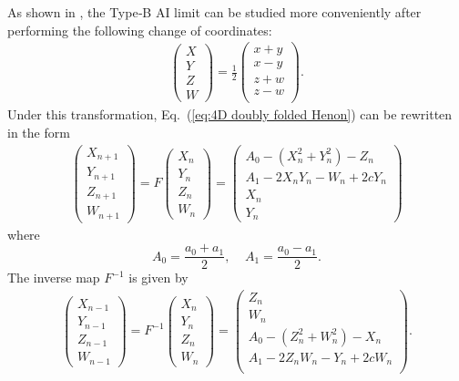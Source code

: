 \documentclass[12pt]{iopart}
\begin{document}
As shown in \cite{Fujioka25}, the Type‑B AI limit can be studied more conveniently after performing the following change of coordinates:
\begin{eqnarray}
	\left(\begin{array}{c}
	X\\
	Y\\
	Z\\
	W
	\end{array}\right)
	=\frac{1}{2}\left(\begin{array}{c}
	x+y\\
	x-y\\
	z+w\\
	z-w\\
	\end{array}\right).
	\label{eq:change_of_coordinate}
\end{eqnarray}
Under this transformation, Eq.~(\ref{eq:4D doubly folded Henon}) can be rewritten in the form
\begin{eqnarray}
\label{eq:map_tranformed}
	\left(\begin{array}{c}
    X_{n+1}\\
    Y_{n+1}\\
    Z_{n+1}\\
    W_{n+1}
  \end{array}\right)
  =F\left(\begin{array}{c}
    X_n\\
    Y_n\\
    Z_n\\
    W_n
  \end{array}\right)
  =\left(\begin{array}{c}
    A_0-(X_n^2+Y_n^2)-Z_n\\
    A_1-2X_nY_n-W_n+2cY_n\\
    X_n\\
    Y_n
  \end{array}\right)
\end{eqnarray}
where $$\displaystyle A_0=\frac{a_0+a_1}{2}, ~~~~~A_1=\frac{a_0-a_1}{2}. $$
The inverse map $F^{-1}$ is given by
\begin{eqnarray}
\label{eq:map_tranformed_inverse}
  \left(\begin{array}{c}
    X_{n-1}\\
    Y_{n-1}\\
    Z_{n-1}\\
    W_{n-1}
  \end{array}\right)
  =F^{-1}\left(\begin{array}{c}
    X_n\\
    Y_n\\
    Z_n\\
    W_n
  \end{array}\right)
  =\left(\begin{array}{c}
    Z_n\\
    W_n\\
    A_0-(Z_n^2+W_n^2)-X_n\\
   A_1-2Z_nW_n-Y_n+2cW_n\\
  \end{array}\right) .
\end{eqnarray}
\end{document}
